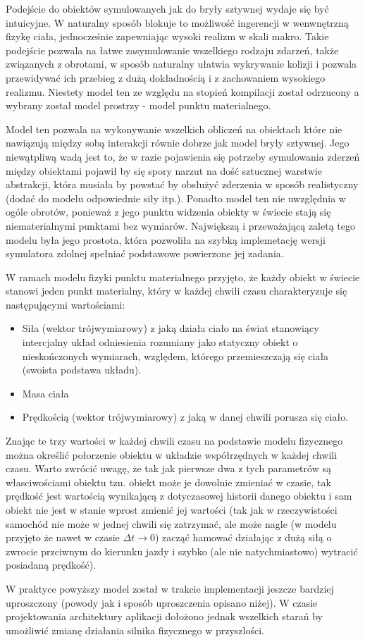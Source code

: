 \par{
Podejście do obiektów symulowanych jak do bryły sztywnej wydaje się być intuicyjne. W naturalny sposób blokuje to możliwość ingerencji w wenwnętrzną fizykę ciała, jednocześnie zapewniając wysoki realizm w skali makro.
Takie podejście pozwala na łatwe zasymulowanie wszelkiego rodzaju zdarzeń, także związanych z obrotami, w sposób naturalny ułatwia wykrywanie kolizji i pozwala przewidywać ich przebieg z dużą dokładnością i z zachowaniem wysokiego realizmu.
Niestety model ten ze względu na stopień kompilacji został odrzucony a wybrany został model prostrzy - model punktu materialnego.
\par{
Model ten pozwala na wykonywanie wszelkich obliczeń na obiektach które nie nawiązują między sobą interakcji równie dobrze jak model bryły sztywnej. Jego niewątpliwą wadą jest to, że w razie pojawienia się potrzeby symulowania zderzeń między obiektami pojawił by się spory narzut na dość sztucznej warstwie abstrakcji, która musiała by powstać by obsłużyć zderzenia w sposób realistyczny (dodać do modelu odpowiednie siły itp.).
Ponadto model ten nie uwzględnia w ogóle obrotów, ponieważ z jego punktu widzenia obiekty w świecie stają się niematerialnymi punktami bez wymiarów.
Największą i przeważającą zaletą tego modelu była jego prostota, która pozwoliła na szybką implemetację wersji symulatora zdolnej spełniać podstawowe powierzone jej zadania. 
}
\par{
W ramach modelu fizyki punktu materialnego przyjęto, że każdy obiekt w świecie stanowi jeden punkt materialny, który w każdej chwili czasu charakteryzuje się następującymi wartościami:
\begin{itemize}
\item Siła (wektor trójwymiarowy) z jaką działa ciało na świat stanowiący intercjalny układ odniesienia rozumiany jako statyczny obiekt o nieskończonych wymiarach, względem, którego przemieszczają się ciała (swoista podstawa układu).
\item Masa ciała
\item Prędkością (wektor trójwymiarowy) z jaką w danej chwili porusza się ciało.
\end{itemize}
Znając te trzy wartości w każdej chwili czasu na podstawie modelu fizycznego można określić połorzenie obiektu w układzie współrzędnych w każdej chwili czasu.
Warto zwrócić uwagę, że tak jak pierwsze dwa z tych parametrów są własciwościami obiektu tzn. obiekt może je dowolnie zmieniać w czasie, tak prędkość jest wartością wynikającą z dotyczasowej historii danego obiektu i sam obiekt nie jest w stanie wprost zmienić jej wartości (tak jak w rzeczywistości samochód nie może w jednej chwili się zatrzymać, ale może nagle (w modelu przyjęto że nawet w czasie $\Delta t \longrightarrow 0$) zacząć hamować działając z dużą siłą o zwrocie przciwnym do kierunku jazdy i szybko (ale nie natychmiastowo) wytracić posiadaną prędkość).
}
\par
{
W praktyce powyższy model został w trakcie implementacji jeszcze bardziej uproszczony (powody jak i sposób uproszczenia opisano niżej). W czasie projektowania architektury aplikacji dołożono jednak wszelkich starań by umożliwić zmianę działania silnika fizycznego w przyszlości.
}

}
